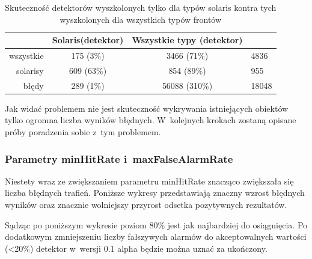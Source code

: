 \begin{table}[!h]
    \centering
    \begin{tabular}{r|c|c|l}
            & Solaris(detektor) & Wszystkie typy (detektor) &           \\
            \hline
wszystkie   & 175 (3\%)         & 3466 (71\%)               & 4836      \\
solarisy    & 609 (63\%)        & 854 (89\%)                & 955       \\
błędy       & 289 (1\%)         & 56088 (310\%)             & 18048     \\
    \end{tabular}
    \caption{Skuteczność detektorów wyszkolonych tylko dla typów solaris kontra tych wyszkolonych dla wszystkich typów frontów}
    \label{tab:sol_vs_all}
\end{table}

Jak widać problemem nie jest skuteczność wykrywania istniejących obiektów
tylko ogromna liczba wyników błędnych. W~kolejnych krokach zostaną opisane
próby poradzenia sobie z~tym problemem.

\subsubsection{Parametry minHitRate i~maxFalseAlarmRate}

Niestety wraz ze zwiększaniem parametru minHitRate znacząco zwiększała
się liczba błędnych trafień. Poniższe wykresy przedstawiają znaczny wzrost
błędnych wyników oraz znacznie wolniejszy przyrost odsetka pozytywnych 
rezultatów.
\begin{center}
\end{center}

Sądząc po poniższym wykresie poziom 80\% jest jak najbardziej do
osiągnięcia. Po dodatkowym zmniejszeniu liczby fałszywych alarmów 
do akceptowalnych wartości (<20\%) detektor w~wersji 0.1 alpha będzie
można uznać za ukończony.

\begin{center}
\end{center}

